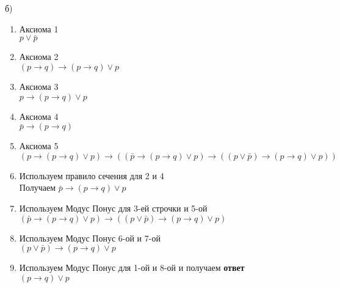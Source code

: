 \documentclass[a4paper, 12pt]{article} %
\begin{document}
б) \begin{enumerate}
    \item Аксиома 1
    \\ $p \vee \bar p$
    \item Аксиома 2 \\
    $(p \rightarrow q) \rightarrow (p \rightarrow q) \vee p$
    \item Аксиома 3 \\
    $p \rightarrow (p \rightarrow q) \vee p$
    \item Аксиома 4 \\
    $\bar p \rightarrow (p \rightarrow q)$
    \item Аксиома 5 \\
    $(p \rightarrow (p \rightarrow q) \vee p) \rightarrow 
    ((\bar p \rightarrow (p \rightarrow q) \vee p) \rightarrow((p \vee \bar p) 
    \rightarrow (p \rightarrow q) \vee p))$
    \item Используем правило сечения для 2 и 4 \\
    Получаем $\bar p \rightarrow (p \rightarrow q) \vee p$
    \item Используем Модус Понус для 3-ей строчки и 5-ой\\
    $(\bar p \rightarrow (p \rightarrow q) \vee p) \rightarrow((p \vee \bar p) 
    \rightarrow (p \rightarrow q) \vee p)$
    \item Используем Модус Понус 6-ой и 7-ой\\
     $(p \vee \bar p) 
    \rightarrow (p \rightarrow q) \vee p$
    \item Используем Модус Понус для 1-ой   и 8-ой и получаем \textbf{ответ}\\
    $(p \rightarrow q) \vee p$
\end{enumerate}
\end{document}
